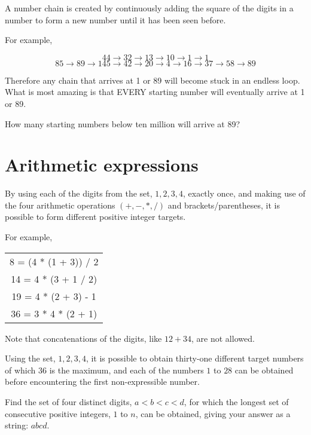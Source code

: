 A number chain is created by continuously adding the square of the digits in a number to form a new number until it has been seen before.

For example,

$$44  \longrightarrow  32  \longrightarrow  13  \longrightarrow  10  \longrightarrow  1 \longrightarrow  1$$
$$85  \longrightarrow  89  \longrightarrow  145 \longrightarrow  42  \longrightarrow  20  \longrightarrow  4  \longrightarrow  16  \longrightarrow  37  \longrightarrow  58  \longrightarrow  89$$

Therefore any chain that arrives at 1 or 89 will become stuck in an endless loop. What is most amazing is that EVERY starting number will eventually arrive at 1 or 89.

How many starting numbers below ten million will arrive at 89?

\section{Arithmetic expressions} \label{pb.093}

By using each of the digits from the set, ${1, 2, 3, 4}$, exactly once, and making use of the four arithmetic operations $(+, -, *, /)$ and brackets/parentheses, it is possible to form different positive integer targets.

For example,
\begin{center}
    \begin{tabular}{c}
        8 = (4 * (1 + 3)) / 2\\
        14 = 4 * (3 + 1 / 2)\\
        19 = 4 * (2 + 3) - 1\\
        36 = 3 * 4 * (2 + 1)\\
    \end{tabular}
\end{center}

Note that concatenations of the digits, like $12 + 34$, are not allowed.

Using the set, ${1, 2, 3, 4}$, it is possible to obtain thirty-one different target numbers of which 36 is the maximum, and each of the numbers $1$ to $28$ can be obtained before encountering the first non-expressible number.

Find the set of four distinct digits, $a < b < c < d$, for which the longest set of consecutive positive integers, $1$ to $n$, can be obtained, giving your answer as a string: $abcd$.

\section{} \label{pb.094}

